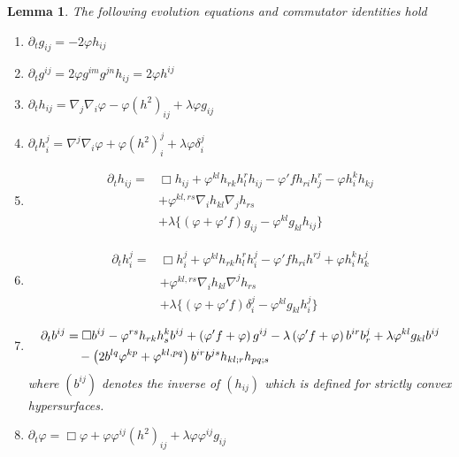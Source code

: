 \documentclass{amsart}
\newtheorem{lemma}[theorem]{Lemma}
\theoremstyle{definition}
\theoremstyle{remark}
\numberwithin{equation}{section}
\begin{document}
\begin{lemma}
The following evolution equations and commutator identities hold
\begin{enumerate}
  \item $\partial_tg_{ij}=-2\varphi h_{ij}$
  \item $\partial_tg^{ij}=2\varphi g^{im}g^{jn}h_{ij}=2\varphi h^{ij}$
  \item $\partial_t h_{ij}=\nabla_j\nabla_i\varphi-\varphi(h^2)_{ij}+\lambda \varphi g_{ij}$
  \item $\partial_t h_i^j=\nabla^j\nabla_i\varphi+\varphi(h^2)_i^j+\lambda \varphi\delta_i^j$
  \item \begin{align*}
\partial_t h_{ij}=&\Box h_{ij}+\varphi^{kl}h_{rk}h_l^rh_{ij}-\varphi'fh_{ri}h_j^r-\varphi h_i^kh_{kj}\\
&+\varphi^{kl,rs}\nabla_ih_{kl}\nabla_jh_{rs}\\
&+\lambda \{(\varphi+\varphi'f)g_{ij}-\varphi^{kl}g_{kl}h_{ij}\}
\end{align*}
  \item \begin{align*}
\partial_t h_i^j=&\Box h_i^j+\varphi^{kl}h_{rk}h_l^rh_i^j-\varphi'fh_{ri}h^{rj}+\varphi h_i^kh_k^j\\
&+\varphi^{kl,rs}\nabla_ih_{kl}\nabla^jh_{rs}\\
&+\lambda \{(\varphi+\varphi'f)\delta_i^j-\varphi^{kl}g_{kl}h_i^j\}
\end{align*}
  \item \begin{align*}
\partial_t b^{ij} &= \Box b^{ij} - \varphi^{rs}h_{rk}h^{k}_{s}b^{ij}+\left(\varphi'f+\varphi\right)g^{ij}-\lambda\left(\varphi'f+\varphi\right)b^{ir}b^{j}_{r}+\lambda\varphi^{kl}g_{kl}b^{ij} \\
& \quad -\left(2b^{lq}\varphi^{kp}+\varphi^{kl,pq}\right)b^{ir}b^{js}h_{kl;r}h_{pq;s}
\end{align*}
where $(b^{ij})$ denotes the inverse of $(h_{ij})$ which is defined for strictly convex hypersurfaces.

  \item $\partial_t \varphi=\Box \varphi+\varphi\varphi^{ij}(h^2)_{ij}+\lambda \varphi\varphi^{ij}g_{ij}$
\end{enumerate}
\end{lemma}


\end{document}
